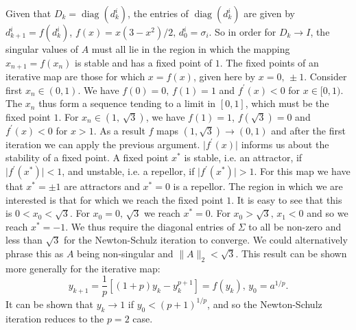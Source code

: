 \documentclass[12pt]{article}
\def\norm#1{\|#1\|}
\def\diag{\mathop{\mathrm{diag}}}     %
\begin{document}
Given that $D_k = \diag(d_k^i)$, the entries of $\diag(d_k^{i})$ are given by
$d^{i}_{k+1} = f(d^{i}_k)$, $f(x) = x(3-x^2)/2\text{, } d_0^{i} = \sigma_i$. So
in order for $D_k \to I$, the singular values of $A$ must all lie in the region
in which the mapping $x_{n+1} = f(x_n)$ is stable and has a fixed point of $1$.
The fixed points of an iterative map are those for which $x = f(x)$, given here
by $x = 0\text{, }\pm 1$.
Consider first $x_n \in (0, 1)$.
We have $f(0) = 0\text{, } f(1) = 1$ and $f^{\prime}(x) < 0$ for $x \in [0, 1)$.
The $x_n$ thus form a sequence tending to a limit in $[0, 1]$,
which must be the fixed point $1$.
For $x_n \in (1\text{, } \sqrt{3})$, we have $f(1) = 1$,
$f(\sqrt{3}) = 0$ and $f^{\prime}(x) < 0$ for $x > 1$.
As a result $f$ maps $(1, \sqrt{3}) \to (0, 1)$ and after the first iteration
we can apply the previous argument.
$\lvert f^{\prime}(x) \rvert$ informs us about the
stability of a fixed point. A fixed point $x^*$ is stable, i.e. an attractor,
if $\lvert f^{\prime}(x^*) \rvert < 1$, and unstable, i.e. a repellor, if
$\lvert f^{\prime}(x^*) \rvert > 1$. For this map we have that $x^* = \pm 1$
are attractors and $x^* = 0$ is a repellor. The region in which we are
interested is that for which we reach the fixed point $1$. It is easy to see
that this is $0 < x_0 < \sqrt{3}$. For $x_0 = 0\text{, } \sqrt{3}$ we reach
$x^* = 0$. For $x_0 > \sqrt{3}\text{, } x_1 < 0$ and so we reach $x^* = -1$.
We thus require the diagonal entries of $\Sigma$ to all be non-zero and less
than $\sqrt{3}$ for the Newton-Schulz iteration to converge. We could
alternatively phrase this as $A$ being non-singular and $\norm{A}_2 < \sqrt{3}$.
This result can be shown more generally for the iterative map:
\begin{equation}
  y_{k+1} = \frac{1}{p}[(1+p)y_k - y_k^{p+1}] = f(y_k)
  \text{, } y_0 = a^{1/p}\text{.}  
\end{equation}
It can be shown \cite{Higham:2008:FM} that $y_k \to 1$ if $y_0 < (p+1)^{1/p}$,
and so the Newton-Schulz iteration reduces to the $p=2$ case.
\end{document}
